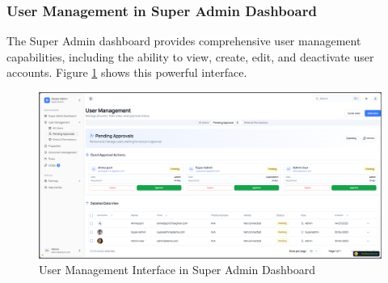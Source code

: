 \subsubsection{User Management in Super Admin Dashboard}
The Super Admin dashboard provides comprehensive user management capabilities, including the ability to view, create, edit, and deactivate user accounts. Figure \ref{fig:user-management} shows this powerful interface.
\newpage
\begin{figure}[htbp]
    \centering
    \includegraphics[width=1\textwidth]{images/user-management-dashboard.png}
    \caption{User Management Interface in Super Admin Dashboard}
    \label{fig:user-management}
\end{figure}

